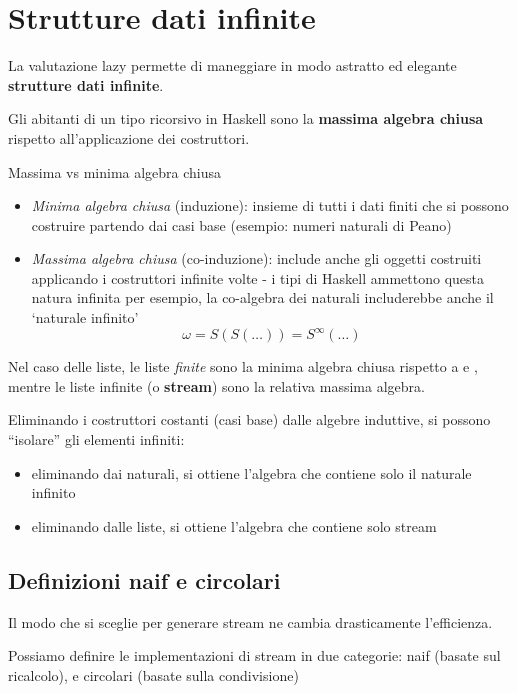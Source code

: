 \section{Strutture dati infinite}
La valutazione lazy permette di maneggiare in modo astratto ed elegante \textbf{strutture dati infinite}.

Gli abitanti di un tipo ricorsivo in Haskell sono la \textbf{massima algebra chiusa} rispetto all'applicazione dei costruttori.

\begin{defframe}{Massima vs minima algebra chiusa}{}
\begin{itemize}
    \item \textit{Minima algebra chiusa} (induzione): insieme di tutti i dati finiti che si possono costruire partendo dai casi base (esempio: numeri naturali di Peano)
    \item \textit{Massima algebra chiusa} (co-induzione): include anche gli oggetti costruiti applicando i costruttori infinite volte - i tipi di Haskell ammettono questa natura infinita
        \subitem per esempio, la co-algebra dei naturali includerebbe anche il `naturale infinito' 
        $$\omega = S(S(\dots))=S^{\infty}(\dots)$$
\end{itemize}
\end{defframe}

Nel caso delle liste, le liste \textit{finite} sono la minima algebra chiusa rispetto a \code{:} e \code{[]}, mentre le liste infinite (o \textbf{stream}) sono la relativa massima algebra.

Eliminando i costruttori costanti (casi base) dalle algebre induttive, si possono ``isolare'' gli elementi infiniti:
\begin{itemize}
    \item eliminando  dai naturali, si ottiene l'algebra che contiene solo il naturale infinito
    \item eliminando \code{[]} dalle liste, si ottiene l'algebra che contiene solo stream
\end{itemize}

\subsection{Definizioni naif e circolari}
Il modo che si sceglie per generare stream ne cambia drasticamente l'efficienza. 

Possiamo definire le implementazioni di stream in due categorie: naif (basate sul ricalcolo), e circolari (basate sulla condivisione)

